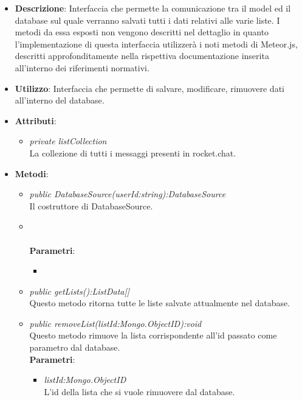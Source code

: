 \begin{itemize}
\item \textbf{Descrizione}: Interfaccia che permette la comunicazione tra il model ed il database sul quale verranno salvati tutti i dati relativi alle varie liste. I metodi da essa esposti non vengono descritti nel dettaglio in quanto l'implementazione di questa interfaccia utilizzerà i noti metodi di Meteor.js, descritti approfonditamente nella rispettiva documentazione inserita all'interno dei riferimenti normativi.
\item \textbf{Utilizzo}: Interfaccia che permette di salvare, modificare, rimuovere dati all'interno del database.
\item \textbf{Attributi}:
	\begin{itemize}
		\item \textit{private listCollection}\\
		La collezione di tutti i messaggi presenti in rocket.chat.
	\end{itemize}
\item \textbf{Metodi}:
	\begin{itemize}
	\item \textit{public DatabaseSource(userId:string):DatabaseSource}\\
	Il costruttore di DatabaseSource.
	\item \textit{}\\
	
			\\ \textbf{Parametri}: \begin{itemize}
			\item \textit{}\\
			
			\end{itemize} 
	\item \textit{public getLists():ListData[]}\\
	Questo metodo ritorna tutte le liste salvate attualmente nel database.
	\item \textit{public removeList(listId:Mongo.ObjectID):void}\\
	Questo metodo rimuove la lista corrispondente all'id passato come parametro dal database.
				\\ \textbf{Parametri}: \begin{itemize}
			\item \textit{listId:Mongo.ObjectID}\\
			L'id della lista che si vuole rimuovere dal database.
			\end{itemize} 
			

\end{itemize}
\end{itemize}
